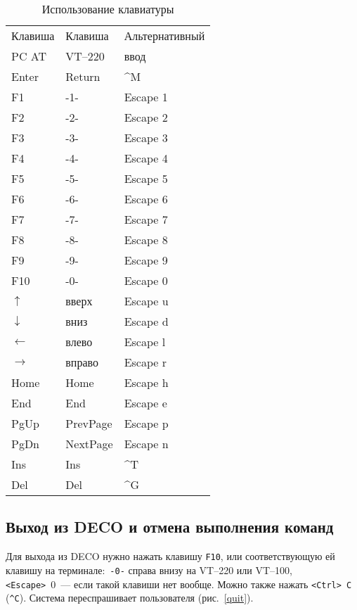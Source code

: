 \begin{table}[bp]
\begin{center}
\begin{tabular}{|l|l|l|}
\hline
Клавиша & Клавиша & Альтернативный \\
PC AT & VT--220 & ввод \\
\hline
Enter & Return & \^{}M \\
F1 & -1- & Escape 1 \\
F2 & -2- & Escape 2 \\
F3 & -3- & Escape 3 \\
F4 & -4- & Escape 4 \\
F5 & -5- & Escape 5 \\
F6 & -6- & Escape 6 \\
F7 & -7- & Escape 7 \\
F8 & -8- & Escape 8 \\
F9 & -9- & Escape 9 \\
F10 & -0- & Escape 0 \\
$\uparrow$ & вверх & Escape u \\
$\downarrow$ & вниз & Escape d \\
$\leftarrow$ & влево & Escape l \\
$\rightarrow$ & вправо & Escape r \\
Home & Home & Escape h \\
End & End & Escape e \\
PgUp & PrevPage & Escape p \\
PgDn & NextPage & Escape n \\
Ins & Ins & \^{}T \\
Del & Del & \^{}G \\
\hline
\end{tabular}
\caption{Использование клавиатуры}
\label{keyboard}
\end{center}
\end{table}

\subsection{Выход из DECO и отмена выполнения команд}

Для выхода из DECO нужно нажать клавишу {\tt F10},
или соответствующую ей клавишу на терминале:~{\tt -0-} справа
внизу на VT--220 или VT--100, {\tt <Escape>}~0~--- если такой
клавиши нет вообще. Можно также нажать {\tt <Ctrl>~C} ({\tt \^{}C}).
Система переспрашивает пользователя (рис.~\ref{quit}).


